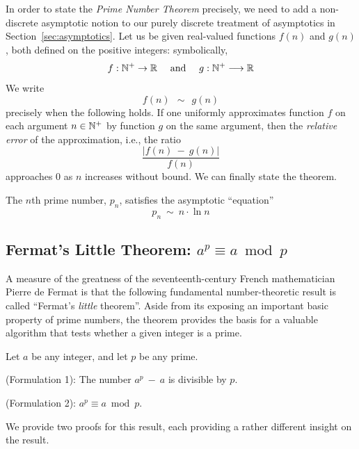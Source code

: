 In order to state the {\it Prime Number Theorem} precisely, we need to add a non-discrete asymptotic notion to our purely discrete treatment of asymptotics in Section~\ref{sec:asymptotics}.  Let us be given real-valued functions $f(n)$ and $g(n)$, both defined on the positive integers: symbolically,
\[
f: \mathbb{N}^+ \rightarrow  \mathbb{R} \ \ \ \mbox{ and } \ \ \
g: \mathbb{N}^+ \longrightarrow  \mathbb{R}
\]
We write
\[ f(n) \ \ \sim \ \ g(n) \]
precisely when the following holds.  If one uniformly approximates function $f$ on each argument $n \in \mathbb{N}^+$ by function $g$ on the same argument, then the {\it relative error} of the approximation, i.e., the ratio
\[ \frac{|f(n) \ - \ g(n)|}{f(n)} \]
approaches $0$ as $n$ increases without bound.  We can finally state the theorem.
\index{approximation, relative error}

\begin{theorem}
\label{thm:prime-number-theorem}
The $n$th prime number, $p_n$, satisfies the asymptotic ``equation'' 
\[ p_{n} \  \sim  \ n \cdot \ln n \]
\end{theorem}
  

\subsection{Fermat's Little Theorem: $a^{p} \equiv a \bmod p$}
\label{sec:fermat}

A measure of the greatness of the seventeenth-century French mathematician Pierre de Fermat is that the following fundamental number-theoretic result is called ``Fermat's {\em little} theorem''.  Aside from its exposing an important basic property of prime numbers, the theorem provides the basis for a valuable algorithm that tests whether a given integer is a prime.

\begin{theorem}
\label{thm:Fermat's-Little-Thm}
Let $a$ be any integer, and let $p$ be any prime.

{\rm (Formulation 1):}
The number $a^p \ - \ a$ is divisible by $p$.

\medskip

{\rm (Formulation 2):}
$a^{p} \equiv a \bmod p$.
\end{theorem}

\smallskip

\noindent
We provide two proofs for this result, each providing a rather different insight on the result.

